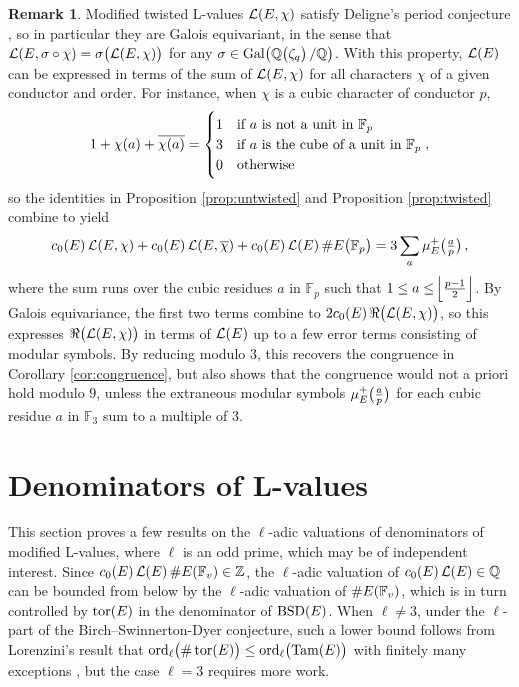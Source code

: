 \documentclass{article}
\theoremstyle{plain}
\theoremstyle{definition}
\newtheorem{remark}[n]{Remark}
\newcommand{\BSD}{\operatorname{BSD}}
\newcommand{\FF}{\mathbb{F}}
\newcommand{\Gal}{\operatorname{Gal}}
\newcommand{\LLL}{\mathcal{L}}
\newcommand{\ord}{\operatorname{ord}}
\newcommand{\QQ}{\mathbb{Q}}
\newcommand{\Tam}{\operatorname{Tam}}
\newcommand{\tor}{\operatorname{tor}}
\newcommand{\ZZ}{\mathbb{Z}}
\newcommand{\br}{\!\del}
\newcommand{\fbr}[2][-1]{\!\ifthenelse{\equal{#1}{-1}}{\left\lfloor#2\right\rfloor}{}\ifthenelse{\equal{#1}{0}}{\lfloor#2\rfloor}{}\ifthenelse{\equal{#1}{1}}{\bigl\lfloor#2\bigr\rfloor}{}}
\begin{document}
\begin{remark}
\label{rem:equality}
Modified twisted L-values $ \LLL\br{E, \chi} $ satisfy Deligne's period conjecture \cite[Theorem 2.7]{BD07}, so in particular they are Galois equivariant, in the sense that $ \LLL\br{E, \sigma \circ \chi} = \sigma\br{\LLL\br{E, \chi}} $ for any $ \sigma \in \Gal\br[1]{\QQ\br{\zeta_q} / \QQ} $. With this property, $ \LLL\br{E} $ can be expressed in terms of the sum of $ \LLL\br{E, \chi} $ for all characters $ \chi $ of a given conductor and order. For instance, when $ \chi $ is a cubic character of conductor $ p $,
$$ 1 + \chi\br{a} + \overline{\chi\br{a}} =
\begin{cases}
1 & \text{if} \ a \ \text{is not a unit in} \ \FF_p \\
3 & \text{if} \ a \ \text{is the cube of a unit in} \ \FF_p \\
0 & \text{otherwise}
\end{cases},
$$
so the identities in Proposition \ref{prop:untwisted} and Proposition \ref{prop:twisted} combine to yield
$$ c_0\br{E}\LLL\br{E, \chi} + c_0\br{E}\LLL\br{E, \overline{\chi}} + c_0\br{E}\LLL\br{E}\#E\br{\FF_p} = 3\sum_a \mu_E^+\br[1]{\tfrac{a}{p}}, $$
where the sum runs over the cubic residues $ a $ in $ \FF_p $ such that $ 1 \le a \le \fbr{\tfrac{p - 1}{2}} $. By Galois equivariance, the first two terms combine to $ 2c_0\br{E}\Re\br{\LLL\br{E, \chi}} $, so this expresses $ \Re\br{\LLL\br{E, \chi}} $ in terms of $ \LLL\br{E} $ up to a few error terms consisting of modular symbols. By reducing modulo $ 3 $, this recovers the congruence in Corollary \ref{cor:congruence}, but also shows that the congruence would not a priori hold modulo $ 9 $, unless the extraneous modular symbols $ \mu_E^+\br[1]{\tfrac{a}{p}} $ for each cubic residue $ a $ in $ \FF_3 $ sum to a multiple of $ 3 $.
\end{remark}

\pagebreak

\section{Denominators of L-values}

\label{sec:denominator}

This section proves a few results on the $ \ell $-adic valuations of denominators of modified L-values, where $ \ell $ is an odd prime, which may be of independent interest. Since $ c_0\br{E}\LLL\br{E}\#E\br{\FF_v} \in \ZZ $, the $ \ell $-adic valuation of $ c_0\br{E}\LLL\br{E} \in \QQ $ can be bounded from below by the $ \ell $-adic valuation of $ \#E\br{\FF_v} $, which is in turn controlled by $ \tor\br{E} $ in the denominator of $ \BSD\br{E} $. When $ \ell \ne 3 $, under the $ \ell $-part of the Birch--Swinnerton-Dyer conjecture, such a lower bound follows from Lorenzini's result that $ \ord_\ell\br{\#\tor\br{E}} \le \ord_\ell\br{\Tam\br{E}} $ with finitely many exceptions \cite[Proposition 1.1]{Lor11}, but the case $ \ell = 3 $ requires more work.
\end{document}
